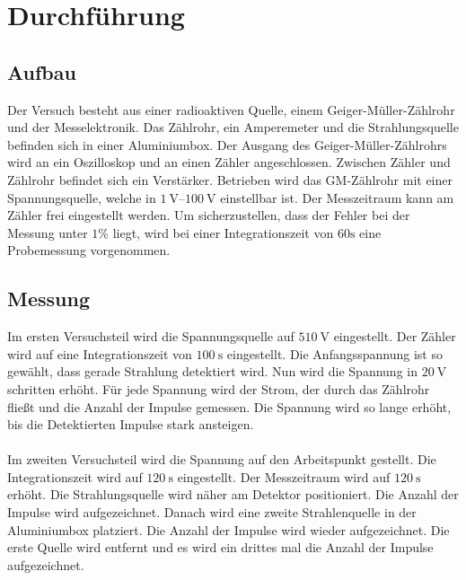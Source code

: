 \section{Durchführung}
\label{sec:Durchführung}

\subsection{Aufbau}

Der Versuch besteht aus einer radioaktiven Quelle, einem Geiger-Müller-Zählrohr und der Messelektronik.
Das Zählrohr, ein Amperemeter und die Strahlungsquelle befinden sich in einer Aluminiumbox.
Der Ausgang des Geiger-Müller-Zählrohrs wird an ein Oszilloskop und an einen Zähler angeschlossen.
Zwischen Zähler und Zählrohr befindet sich ein Verstärker. 
Betrieben wird das GM-Zählrohr mit einer Spannungsquelle, welche in $\SIrange{1}{100}{\volt}$ einstellbar ist.
Der Messzeitraum kann am Zähler frei eingestellt werden.
Um sicherzustellen, dass der Fehler bei der Messung unter $1\%$ liegt, wird bei einer Integrationszeit von $60\si{\second}$ eine Probemessung vorgenommen.

\subsection{Messung}

Im ersten Versuchsteil wird die Spannungsquelle auf $\SI{510}{\volt}$ eingestellt. Der Zähler wird auf eine Integrationszeit von $\SI{100}{\second}$ eingestellt.
Die Anfangsspannung ist so gewählt, dass gerade Strahlung detektiert wird. Nun wird die Spannung in $\SI{20}{\volt}$ schritten erhöht.
Für jede Spannung wird der Strom, der durch das Zählrohr fließt und die Anzahl der Impulse gemessen.
Die Spannung wird so lange erhöht, bis die Detektierten Impulse stark ansteigen.\\
\\
Im zweiten Versuchsteil wird die Spannung auf den Arbeitspunkt gestellt. Die Integrationszeit wird auf $\SI{120}{\second}$ eingestellt. 
Der Messzeitraum wird auf $\SI{120}{\second}$ erhöht. Die Strahlungsquelle wird näher am Detektor positioniert.
Die Anzahl der Impulse wird aufgezeichnet. Danach wird eine zweite Strahlenquelle in der Aluminiumbox platziert.
Die Anzahl der Impulse wird wieder aufgezeichnet. 
Die erste Quelle wird entfernt und es wird ein drittes mal die Anzahl der Impulse aufgezeichnet.\\
\\